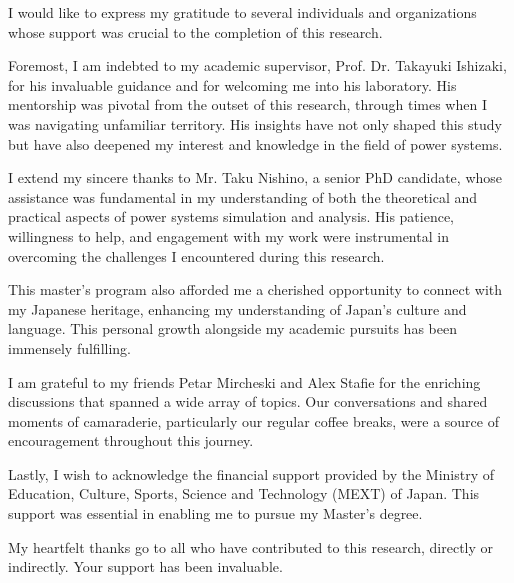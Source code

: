 \begin{acknowledge}
I would like to express my gratitude to several individuals and organizations
whose support was crucial to the completion of this research.

Foremost, I am indebted to my academic supervisor, Prof. Dr. Takayuki Ishizaki,
for his invaluable guidance and for welcoming me into his laboratory. His
mentorship was pivotal from the outset of this research, through times when I
was navigating unfamiliar territory. His insights have not only shaped this
study but have also deepened my interest and knowledge in the field of power
systems.

I extend my sincere thanks to Mr. Taku Nishino, a senior PhD candidate, whose
assistance was fundamental in my understanding of both the theoretical and
practical aspects of power systems simulation and analysis. His patience,
willingness to help, and engagement with my work were instrumental in overcoming
the challenges I encountered during this research.

This master's program also afforded me a cherished opportunity to connect with
my Japanese heritage, enhancing my understanding of Japan's culture and
language. This personal growth alongside my academic pursuits has been immensely
fulfilling.

I am grateful to my friends Petar Mircheski and Alex Stafie for the enriching
discussions that spanned a wide array of topics. Our conversations and shared
moments of camaraderie, particularly our regular coffee breaks, were a source of
encouragement throughout this journey.

Lastly, I wish to acknowledge the financial support provided by the Ministry of
Education, Culture, Sports, Science and Technology (MEXT) of Japan. This support
was essential in enabling me to pursue my Master's degree.

My heartfelt thanks go to all who have contributed to this research, directly or
indirectly. Your support has been invaluable.
\end{acknowledge}